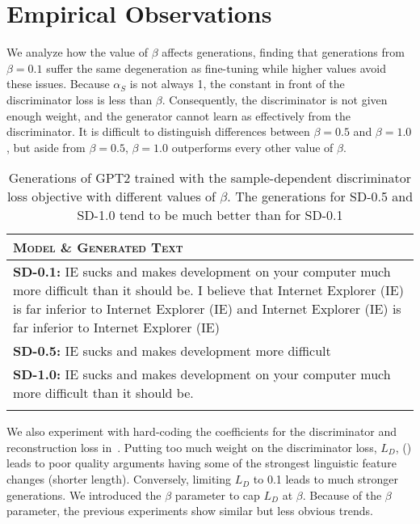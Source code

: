 \section{Empirical Observations}
\label{section:discussion}

We analyze how the value of $\beta$ affects generations, finding that generations from $\beta=0.1$ suffer the same degeneration as fine-tuning while higher values avoid these issues. Because $\alpha_{S}$ is not always 1, the constant in front of the discriminator loss is less than $\beta$. Consequently, the discriminator is not given enough weight, and the generator cannot learn as effectively from the discriminator. It is difficult to distinguish differences between $\beta=0.5$ and $\beta=1.0$, but aside from $\beta=0.5$, $\beta=1.0$ outperforms every other value of $\beta$.  

\begin{table}[t]
  \small
  \centering
  \caption{Generations of GPT2 trained with the sample-dependent discriminator loss objective with different values of $\beta$. The generations for SD-0.5 and SD-1.0 tend to be much better than for SD-0.1}
  \label{tab:example_beta}
  \begin{tabularx}{\linewidth}{@{}>{\raggedright\arraybackslash}X@{}}
   \toprule[1.5pt]
  \textsc{Model} \& \textsc{Generated Text}\\
  \midrule[0.75pt]
  \textbf{SD-0.1:} IE sucks and makes development on your computer much more difficult than it should be. I believe that Internet Explorer (IE) is far inferior to Internet Explorer (IE) and Internet Explorer (IE) is far inferior to Internet Explorer (IE) \\
\textbf{SD-0.5:} IE sucks and makes development more difficult \\
\textbf{SD-1.0:} IE sucks and makes development on your computer much more difficult than it should be.  \\

  \bottomrule[1.5pt]\\
  \end{tabularx}
  \vspace{-20pt}
  \end{table}

We also experiment with hard-coding the coefficients for the discriminator and reconstruction loss in~. Putting too much weight on the discriminator loss, $L_D$, () leads to poor quality arguments having some of the strongest linguistic feature changes (\eg shorter length). Conversely, limiting $L_D$ to 0.1 leads to much stronger generations. We introduced the $\beta$ parameter to cap $L_D$ at $\beta$. Because of the $\beta$ parameter, the previous experiments show similar but less obvious trends. 

